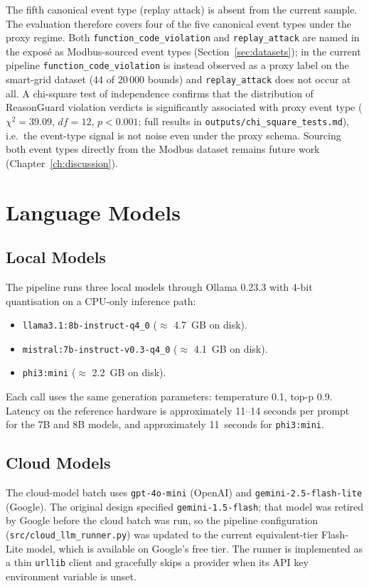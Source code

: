 The fifth canonical event type (replay attack) is absent from the current
sample. The evaluation therefore covers four of the five canonical event
types under the proxy regime. Both \texttt{function\_code\_violation} and
\texttt{replay\_attack} are named in the exposé as Modbus-sourced event
types (Section~\ref{sec:datasets}); in the current pipeline
\texttt{function\_code\_violation} is instead observed as a proxy label on
the smart-grid dataset (44 of 20\,000 bounds) and \texttt{replay\_attack}
does not occur at all. A chi-square test of independence confirms that the
distribution of ReasonGuard violation verdicts is significantly associated
with proxy event type ($\chi^2=39.09$, $df=12$, $p<0.001$; full results in
\texttt{outputs/chi\_square\_tests.md}), i.e.\ the event-type signal is not
noise even under the proxy schema. Sourcing both event types directly from
the Modbus dataset remains future work (Chapter~\ref{ch:discussion}).

\section{Language Models}
\label{sec:models}

\subsection{Local Models}
The pipeline runs three local models through Ollama 0.23.3 with 4-bit
quantisation on a CPU-only inference path:

\begin{itemize}
  \item \texttt{llama3.1:8b-instruct-q4\_0} ($\approx$ 4.7~GB on disk).
  \item \texttt{mistral:7b-instruct-v0.3-q4\_0} ($\approx$ 4.1~GB on disk).
  \item \texttt{phi3:mini} ($\approx$ 2.2~GB on disk).
\end{itemize}

Each call uses the same generation parameters: temperature 0.1, top-p 0.9.
Latency on the reference hardware is approximately 11--14 seconds per
prompt for the 7B and 8B models, and approximately 11~seconds for
\texttt{phi3:mini}.

\subsection{Cloud Models}
\label{subsec:cloud-models}

The cloud-model batch uses \texttt{gpt-4o-mini} (OpenAI) and
\texttt{gemini-2.5-flash-lite} (Google). The original design specified
\texttt{gemini-1.5-flash}; that model was retired by Google before the
cloud batch was run, so the pipeline configuration
(\texttt{src/cloud\_llm\_runner.py}) was updated to the current
equivalent-tier Flash-Lite model, which is available on Google's free tier.
The runner is implemented as a thin \texttt{urllib} client and gracefully
skips a provider when its API key environment variable is unset.

